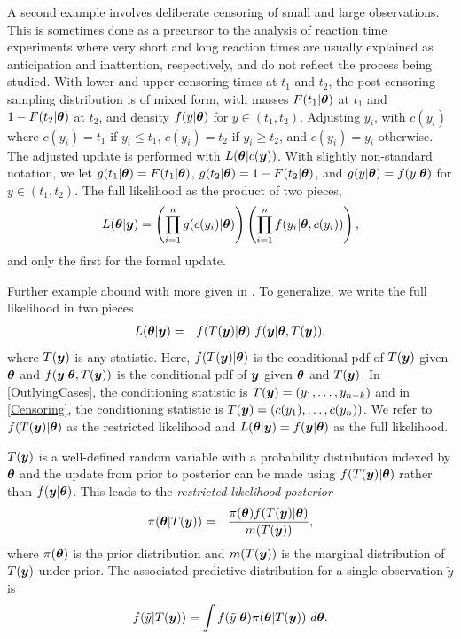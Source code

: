 \documentclass[11pt]{article}
\def\bth{\mbox{\boldmath $\theta$}}
\newcommand{\by}{\mbox{\boldmath $y$}}
\begin{document}
A second example involves deliberate censoring of small and large observations.  This is
sometimes done as a precursor to the analysis of reaction time
experiments  \citep[e.g.,][]{ratcliff1993} where very short and long reaction times are usually explained as anticipation and inattention, respectively, and do not reflect the process being studied.
With lower and upper censoring times at $t_1$ and $t_2$, the post-censoring sampling distribution
is of mixed form, with masses $F(t_1|\bth)$ at $t_1$ and $1-F(t_2|\bth)$ at $t_2$,
and density $f(y | \bth)$ for $y \in (t_1, t_2)$.  Adjusting $y_i$,
with $c(y_i)$ where $c(y_i)= t_1$ if $y_i \leq t_1$, $c(y_i)=t_2$ 
if $y_i \geq t_2$, and $c(y_i)=y_i$ otherwise.  
The adjusted update is performed with $L(\bth |c(\by))$.  
With slightly non-standard notation, we let $g(t_1|\bth) = F(t_1|\bth)$,
$g(t_2 | \bth) = 1 - F(t_2|\bth)$, and $g(y|\bth)=f(y|\bth)$ for
$y \in (t_1, t_2)$. The full likelihood as the product of two pieces, 
\begin{eqnarray}
\label{Censoring}
L(\bth | \by) =  \left( \prod_{i=1}^n g(c(y_i)  | \bth) \right) \left( \prod_{i=1}^n f(y_i|\bth,c(y_i) ) \right) ,  
\end{eqnarray}
and only the first for the formal update.  

Further example abound with more given in \cite{lewis2014}. To generalize, we write the full likelihood in two pieces
\begin{eqnarray}
\label{FullLikelihood}
L(\bth | \by)  & = & f(T(\by) | \bth) \,\, f(\by |\bth, T(\by)) .  
\end{eqnarray}
where $T(\by)$ is any statistic. Here,  $f(T(\by) | \bth)$ is the conditional pdf of $T(\by)$ given $\bth$ and $f(\by |\bth, T(\by))$ is the conditional pdf of $\by$ given $\bth$ and $T(\by)$.  In \eqref{OutlyingCases}, the conditioning statistic is $T(\by) = (y_1, \ldots, y_{n-k})$ and in \eqref{Censoring}, the conditioning statistic is $T(\by) = (c(y_1),\ldots,c(y_n))$.  We refer to 
$f(T(\by) | \bth)$ as the restricted likelihood and $L(\bth | \by)=f(\by|\bth)$ as the full likelihood.  

$T(\by)$ is a well-defined random variable with a probability distribution indexed by $\bth$ and the update from prior  to posterior can be made using $f(T(\by)|\bth)$ rather than $f(\by|\bth)$.  This leads to the \textit{restricted likelihood posterior}
\begin{eqnarray}
\label{RestrictedPosterior}
\pi(\bth | T(\by)) & = & \frac{\pi(\bth) f(T(\by) | \bth)}{m(T(\by))} ,
\end{eqnarray}
where $\pi(\bth)$ is the prior distribution and $m(T(\by))$ is the marginal distribution of $T(\by)$ under prior. The associated predictive distribution for a single observation $\tilde y$ is
\begin{eqnarray}
\label{RestrictedpredDist}
f(\tilde y | T(\by)) = \int f(\tilde y | \bth) \pi(\bth | T(\by))\ d\bth .  
\end{eqnarray}
\end{document}

